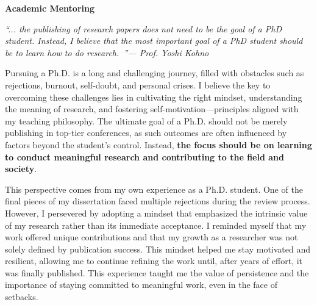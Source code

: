 \documentclass{article}
\begin{document}
\vspace{.5em}
\noindent\textbf{Academic Mentoring}\vspace{.5em}

\noindent \emph{``... the publishing of research papers does not need to be the goal of a PhD student. Instead, I believe that the most important goal of a PhD student should be to learn how to do research.~\cite{Kohno}''\hfill--- Prof. Yoshi Kohno}

\vspace{.5em}

Pursuing a Ph.D. is a long and challenging journey, filled with obstacles such as rejections, burnout, self-doubt, and personal crises. I believe the key to overcoming these challenges lies in cultivating the right mindset, understanding the meaning of research, and fostering self-motivation—principles aligned with my teaching philosophy. The ultimate goal of a Ph.D. should not be merely publishing in top-tier conferences, as such outcomes are often influenced by factors beyond the student's control. Instead, \textbf{the focus should be on learning to conduct meaningful research and contributing to the field and society}.

This perspective comes from my own experience as a Ph.D. student. One of the final pieces of my dissertation faced multiple rejections during the review process. However, I persevered by adopting a mindset that emphasized the intrinsic value of my research rather than its immediate acceptance. I reminded myself that my work offered unique contributions and that my growth as a researcher was not solely defined by publication success. This mindset helped me stay motivated and resilient, allowing me to continue refining the work until, after years of effort, it was finally published. This experience taught me the value of persistence and the importance of staying committed to meaningful work, even in the face of setbacks.
\end{document}
